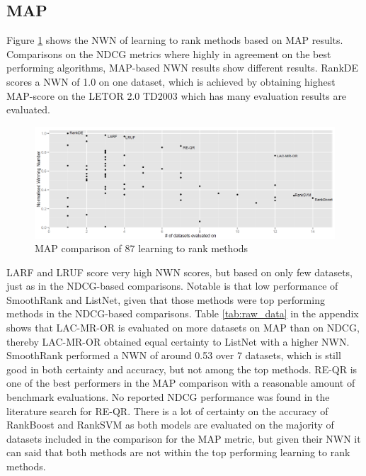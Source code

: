 \documentclass{llncs}
\begin{document}
\subsection{MAP}
Figure \ref{fig:normalized_winning_number_map} shows the NWN of learning to rank methods based on MAP results. Comparisons on the NDCG metrics where highly in agreement on the best performing algorithms, MAP-based NWN results show different results. RankDE scores a NWN of 1.0 on one dataset, which is achieved by obtaining highest MAP-score on the LETOR 2.0 TD2003 which has many evaluation results are evaluated.
\begin{figure}
\centering
\includegraphics[scale=0.19]{gfx/map_winnum}
\caption{MAP comparison of 87 learning to rank methods}
\label{fig:normalized_winning_number_map}
\end{figure}
LARF and LRUF score very high NWN scores, but based on only few datasets, just as in the NDCG-based comparisons. Notable is that low performance of SmoothRank and ListNet, given that those methods were top performing methods in the NDCG-based comparisons. Table \ref{tab:raw_data} in the appendix shows that LAC-MR-OR is evaluated on more datasets on MAP than on NDCG, thereby LAC-MR-OR obtained equal certainty to ListNet with a higher NWN. SmoothRank performed a NWN of around 0.53 over 7 datasets, which is still good in both certainty and accuracy, but not among the top methods. RE-QR is one of the best performers in the MAP comparison with a reasonable amount of benchmark evaluations. No reported NDCG performance was found in the literature search for RE-QR. There is a lot of certainty on the accuracy of RankBoost and RankSVM as both models are evaluated on the majority of datasets included in the comparison for the MAP metric, but given their NWN it can said that both methods are not within the top performing learning to rank methods.
\end{document}
